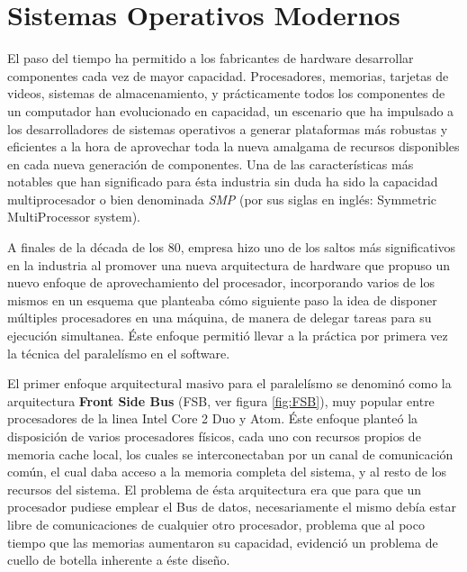 \section{Sistemas Operativos Modernos}
El paso del tiempo ha permitido a los fabricantes de hardware desarrollar componentes cada vez de mayor capacidad. Procesadores, memorias, tarjetas de videos, sistemas de almacenamiento, y prácticamente todos los componentes de un computador han evolucionado en capacidad, un escenario que ha impulsado a los desarrolladores de sistemas operativos a generar plataformas más robustas y eficientes a la hora de aprovechar toda la nueva amalgama de recursos disponibles en cada nueva generación de componentes. Una de las características más notables que han significado para ésta industria sin duda ha sido la capacidad multiprocesador o bien denominada \emph{SMP} (por sus siglas en inglés: Symmetric MultiProcessor system).

A finales de la década de los 80, {empresa} hizo uno de los saltos más significativos en la industria al promover una nueva arquitectura de hardware que propuso un nuevo enfoque de aprovechamiento del procesador, incorporando varios de los mismos en un esquema que planteaba cómo siguiente paso la idea de disponer múltiples procesadores en una máquina, de manera de delegar tareas para su ejecución simultanea. Éste enfoque permitió llevar a la práctica por primera vez la técnica del paralelísmo en el software.

El primer enfoque arquitectural masivo para el paralelísmo se denominó como la arquitectura \textbf{Front Side Bus} (FSB, ver figura \ref{fig:FSB}), muy popular entre procesadores de la linea Intel Core 2 Duo y Atom. Éste enfoque planteó la disposición de varios procesadores físicos, cada uno con recursos propios de memoria cache local, los cuales se interconectaban por un canal de comunicación común, el cual daba acceso a la memoria completa del sistema, y al resto de los recursos del sistema. El problema de ésta arquitectura era que para que un procesador pudiese emplear el Bus de datos, necesariamente el mismo debía estar libre de comunicaciones de cualquier otro procesador, problema que al poco tiempo que las memorias aumentaron su capacidad, evidenció un problema de cuello de botella inherente a éste diseño.

